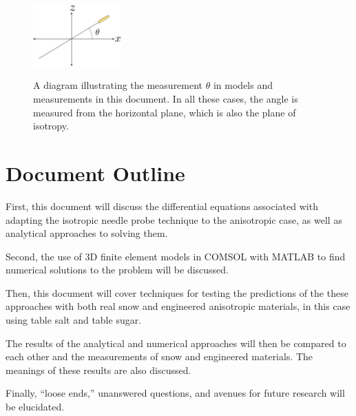 \begin{figure}[h]
\centering
\includegraphics[width=0.3\textwidth]{fig/angle.png}
\label{fig:angle}
\caption{A diagram illustrating the measurement \(\theta\) in models and
measurements in this document. In all these cases, the angle is measured from
the horizontal plane, which is also the plane of isotropy. }
\end{figure}


\section{Document Outline}

First, this document will discuss the differential equations associated with
adapting the isotropic needle probe technique to the anisotropic case, as well
as analytical approaches to solving them. 

Second, the use of 3D finite element models in COMSOL with MATLAB to find 
numerical solutions to the problem will be discussed.

Then, this document will cover techniques for testing the predictions of the
these approaches with both real snow and engineered anisotropic materials, in
this case using table salt and table sugar.

The results of the analytical and numerical approaches will then be compared to
each other and the measurements of snow and engineered materials. The meanings
of these results are also discussed.

Finally, ``loose ends,'' unanswered questions, and avenues for future research
will be elucidated.
